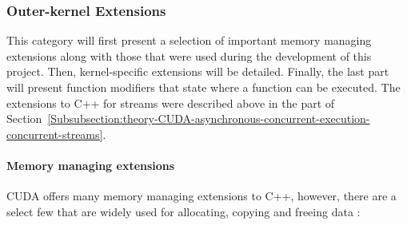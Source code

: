 \subsubsection{Outer-kernel Extensions}\label{Subsubsection:theory-CUDA-C++-extensions-outer-kernel-extensions}
This category will first present a selection of important memory managing extensions along with those that were used during the development of this project. Then, kernel-specific extensions will be detailed. Finally, the last part will present function modifiers that state where a function can be executed. The extensions to C++ for streams were described above in the \textit{} part of Section~\ref{Subsubsection:theory-CUDA-asynchronous-concurrent-execution-concurrent-streams}.

\paragraph{Memory managing extensions}\label{Paragraph:theory-CUDA-C++-extensions-outer-kernel-extensions-memory-managing-extensions}
CUDA offers many memory managing extensions to C++, however, there are a select few that are widely used for allocating, copying and freeing data \cite{NVIDIAMay2022, NvidiaJanuary2022, Cejka2020}:

